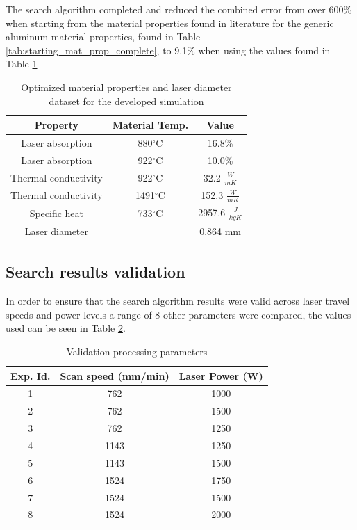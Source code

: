 \documentclass[pdflatex,sn-mathphys]{sn-jnl}
\newcommand{\degree}{$^\circ$}
\begin{document}
	The search algorithm completed and reduced the combined error from over 600\% when starting from the material properties found in literature for the generic aluminum material properties, found in Table \ref{tab:starting_mat_prop_complete}, to 9.1\% when using the values found in Table \ref{tab:7000_mat_prop_complete}
	\begin{table}[!htb]
		\centering
		\caption{Optimized material properties and laser diameter dataset for the developed simulation}
		\label{tab:7000_mat_prop_complete}
			\begin{tabular}{|c|c|c|} \hline 
				Property & Material Temp. & Value \\ \hline
				Laser absorption & 880\degree C & 16.8\% \\ \hline
				Laser absorption & 922\degree C & 10.0\%\\ \hline
				Thermal conductivity & 922\degree C & 32.2 $\frac{W}{mK}$\\ \hline
				Thermal conductivity & 1491\degree C & 152.3 $\frac{W}{mK}$\\ \hline
				Specific heat & 733\degree C & 2957.6 $\frac{J}{kgK}$ \\ \hline
				Laser diameter & & 0.864 mm \\ \hline
			\end{tabular}
	\end{table}


	\subsection{Search results validation} \label{validation}

	In order to ensure that the search algorithm results were valid across laser travel speeds and power levels a range of 8 other parameters were compared, the values used can be seen in Table \ref{tab:val_parameters}.
	\begin{table}[!htb]
		\centering
		\caption{Validation processing parameters}
		\label{tab:val_parameters}
			\begin{tabular}{|c|c|c|} \hline 
				Exp. Id. & Scan speed (mm/min) & Laser Power (W) \\ \hline
				1 & 762 & 1000 \\ \hline  %
				2 & 762 & 1500 \\ \hline  %
				3 & 762 & 1250 \\ \hline  %
				4 & 1143 & 1250 \\ \hline %
				5 & 1143 & 1500 \\ \hline  %
				6 & 1524 & 1750 \\ \hline  %
				7 & 1524 & 1500 \\ \hline  %
				8 & 1524 & 2000 \\ \hline  %
			\end{tabular}
	\end{table}
\end{document}
